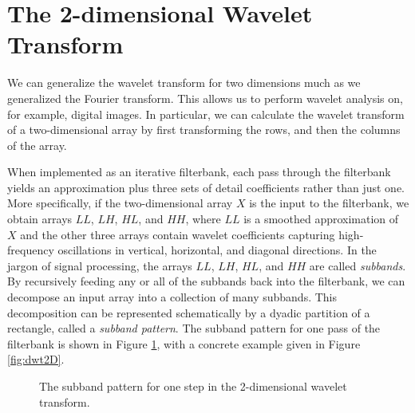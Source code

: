 \section*{The 2-dimensional Wavelet Transform} %

We can generalize the wavelet transform for two dimensions much as we generalized the Fourier transform.
This allows us to perform wavelet analysis on, for example, digital images.
In particular, we can calculate the wavelet transform of a two-dimensional
array  by first transforming the rows, and then the columns of the array.

When implemented as an iterative filterbank, each pass through the filterbank yields an approximation plus three sets of detail coefficients
rather than just one.
More specifically, if the two-dimensional array $X$ is the input to the filterbank, we obtain arrays $LL$, $LH$, $HL$, and $HH$,
where $LL$ is a smoothed approximation of $X$ and the other three arrays contain wavelet coefficients capturing high-frequency
oscillations in vertical, horizontal, and diagonal directions.
In the jargon of signal processing, the arrays $LL$, $LH$, $HL$, and $HH$ are called \emph{subbands}.
By recursively feeding any or all of the subbands back into the filterbank, we can decompose an input array into a collection
of many subbands.
This decomposition can be represented schematically by a dyadic partition of a rectangle, called a \emph{subband pattern}.
The subband pattern for one pass of the filterbank is shown in Figure \ref{fig:2dsubbands}, with a concrete example given in Figure \ref{fig:dwt2D}.
\begin{figure}[H]
\caption{The subband pattern for one step in the 2-dimensional wavelet transform.}
\label{fig:2dsubbands}
\end{figure}
